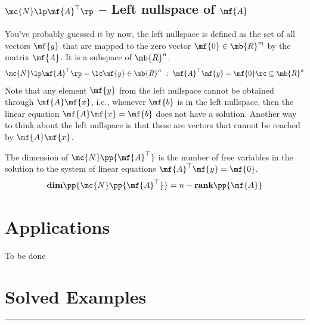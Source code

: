 \subsection{$\mc{N}\lp \mf{A}^\top \rp$ -- Left nullspace of $\mf{A}$}
You've probably guessed it by now, the left nullspace is defined as the set of all vectors $\mf{y}$ that are mapped to the zero vector $\mf{0} \in \mb{R}^m$ by the matrix $\mf{A}$. It is a subspace of $\mb{R}^{n}$.
\begin{equation}
    \mc{N}\lp \mf{A}^\top \rp = \lc \mf{y} \in \mb{R}^n \,\, : \,\, \mf{A}^\top\mf{y} = \mf{0} \rc \subseteq \mb{R}^n
    \label{eq:ch-lintrans-leftnullspace}
\end{equation}
Note that any element $\mf{y}$ from the left nullspace cannot be obtained through $\mf{A}\mf{x}$, i.e., whenever $\mf{b}$ is in the left nullspace, then the linear equation $\mf{A}\mf{x} = \mf{b}$ does not have a solution. Another way to think about the left nullspace is that these are vectors that cannot be reached by $\mf{A}\mf{x}$. 

\noindent The dimension of $\mc{N}\pp{\mf{A}^\top}$ is the number of free variables in the solution to the system of linear equations $\mf{A}^\top\mf{y} = \mf{0}$.
\[ \textbf{dim}\pp{\mc{N}\pp{\mf{A}^\top}} = n - \textbf{rank}\pp{\mf{A}} \]

\section{Applications}\label{sec:ch03-appln}
To be done
\newpage

\section{Solved Examples}
\vspace{-0.5cm}
\begin{center}
    \rule{\textwidth}{1pt}
\end{center}

